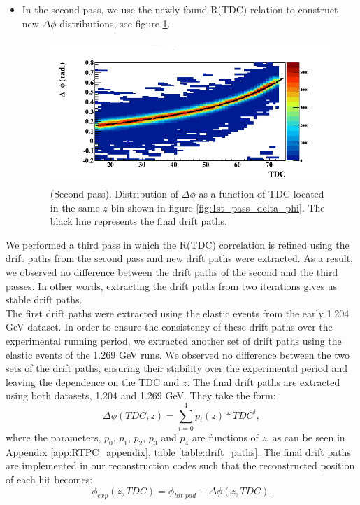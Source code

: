 \begin{itemize}
\item In the second pass, we use the newly found R(TDC) relation to construct new $\Delta \phi$ distributions, see figure \ref{fig:final_drift_paths}.

\begin{figure}[tp]
\centering
\includegraphics[scale=0.45]{fig_rtpc/FitResult_p2_10.png}
\caption{(Second pass). Distribution of $\Delta \phi$ as a function of TDC 
located in the same $z$ bin shown in figure \ref{fig:1st_pass_delta_phi}. The 
black line represents the final drift paths.}
\label{fig:final_drift_paths}
\end{figure}
\end{itemize}

We performed a third pass in which the R(TDC) correlation is refined using the 
drift paths from the second pass and new drift paths were extracted. As a 
result, we observed no difference between the drift paths of the second and the 
third passes. In other words, extracting the drift paths from two iterations 
gives us stable drift paths. \\
 
The first drift paths were extracted using the elastic events from the early 
1.204 GeV dataset. In order to ensure the consistency of these drift paths over 
the experimental running period, we extracted another set of drift paths using 
the elastic events of the 1.269 GeV runs. We observed no difference between the 
two sets of the drift paths, ensuring their stability over the experimental 
period and leaving the dependence on the TDC and $z$. The final drift paths are 
extracted using both datasets, 1.204 and 1.269 GeV. They take the form:
\vspace{-0.1in}
\begin{equation}
\Delta \phi (TDC, z)=  \sum\limits_{i=0}^{4} p_{i}(z)*TDC^{i},
\end{equation}
where the parameters, $p_{0}$, $p_{1}$, $p_{2}$, $p_{3}$ and $p_{4}$ are 
functions of $z$, as can be seen in Appendix \ref{app:RTPC_appendix}, table 
\ref{table:drift_paths}. The final drift paths are implemented in our 
reconstruction codes such that the reconstructed position of each hit becomes:
\begin{equation}
\phi_{exp}(z, TDC) = \phi _{hit\_pad} - \Delta \phi (z, TDC).
\end{equation} 

